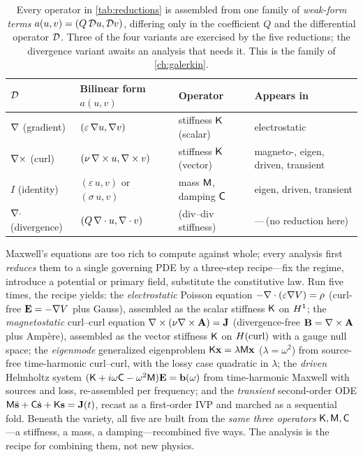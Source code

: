 \begin{table}[t]
\centering
\caption[The bilinear-form family behind the operators]{Every operator in
\cref{tab:reductions} is assembled from one family of \emph{weak-form terms}
$a(u,v)=(Q\,\mathcal{D} u,\mathcal{D} v)$, differing only in the coefficient $Q$ and the
differential operator $\mathcal{D}$. Three of the four variants are exercised by the
five reductions; the divergence variant awaits an analysis that needs it. This is
the  family of \cref{ch:galerkin}.}
\label{tab:weakforms}
\small
\setlength{\tabcolsep}{6pt}
\renewcommand{\arraystretch}{1.25}
\begin{tabular}{@{}llll@{}}
\toprule
$\mathcal{D}$ & Bilinear form $a(u,v)$ & Operator & Appears in \\
\midrule
$\nabla$ (gradient)
  & $(\varepsilon\,\nabla u,\nabla v)$
  & stiffness $\mathsf{K}$ (scalar)
  & electrostatic \\
$\nabla\times$ (curl)
  & $(\nu\,\nabla\times u,\nabla\times v)$
  & stiffness $\mathsf{K}$ (vector)
  & magneto-, eigen, driven, transient \\
$I$ (identity)
  & $(\varepsilon\,u,v)$ or $(\sigma\,u,v)$
  & mass $\mathsf{M}$, damping $\mathsf{C}$
  & eigen, driven, transient \\
$\nabla\cdot$ (divergence)
  & $(Q\,\nabla\cdot u,\nabla\cdot v)$
  & (div--div stiffness)
  & ---\,(no reduction here) \\
\bottomrule
\end{tabular}
\end{table}

\summarysection
Maxwell's equations are too rich to compute against whole; every analysis first
\emph{reduces} them to a single governing PDE by a three-step recipe---fix the
regime, introduce a potential or primary field, substitute the constitutive law.
Run five times, the recipe yields: the \emph{electrostatic} Poisson equation
$-\nabla\cdot(\varepsilon\nabla V)=\rho$ (curl-free $\mathbf{E}=-\nabla V$ plus Gauss), assembled
as the scalar stiffness $\mathsf{K}$ on $H^1$; the \emph{magnetostatic} curl--curl
equation $\nabla\times(\nu\nabla\times\mathbf{A})=\mathbf{J}$ (divergence-free $\mathbf{B}=\nabla\times\mathbf{A}$ plus
Amp\`ere), assembled as the vector stiffness $\mathsf{K}$ on $H(\mathrm{curl})$ with a gauge null
space; the \emph{eigenmode} generalized eigenproblem $\mathsf{K}\mathbf{x}=\lambda\mathsf{M}\mathbf{x}$
($\lambda=\omega^2$) from source-free time-harmonic curl--curl, with the lossy
case quadratic in $\lambda$; the \emph{driven} Helmholtz system
$(\mathsf{K}+i\omega\mathsf{C}-\omega^2\mathsf{M})\mathbf{E}=\mathbf{b}(\omega)$ from time-harmonic Maxwell with
sources and loss, re-assembled per frequency; and the \emph{transient}
second-order ODE $\mathsf{M}\ddot{\mathbf{s}}+\mathsf{C}\dot{\mathbf{s}}+\mathsf{K}\mathbf{s}=\mathbf{J}(t)$, recast as a
first-order IVP and marched as a sequential fold. Beneath the variety, all five
are built from the \emph{same three operators} $\mathsf{K},\mathsf{M},\mathsf{C}$---a stiffness, a
mass, a damping---recombined five ways. The analysis is the recipe for combining
them, not new physics.

